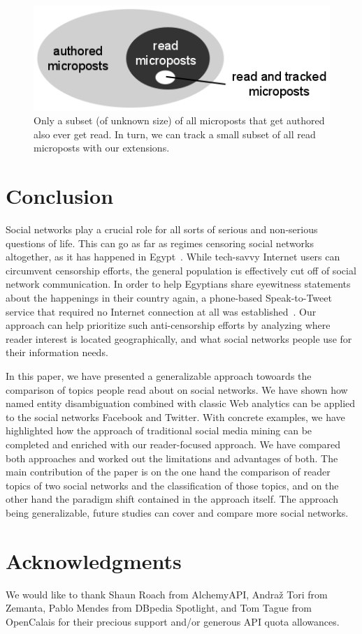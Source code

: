 \documentclass{iosart2c}
\begin{document}
\begin{figure}
\centering
\includegraphics[width=0.6\linewidth]{./resources/vennreadunread.png}
\caption{Only a subset (of unknown size) of all microposts that get authored also ever get read. In turn, we can track a small subset of all read microposts with our extensions.}
\label{fig:vennreadunread}
\end{figure}

\section{Conclusion} \label{sec:conclusion}
Social networks play a crucial role for all sorts of serious and non-serious questions of life.
This can go as far as regimes censoring social networks altogether, as it has happened in Egypt~\cite{censor}.
While tech-savvy Internet users can circumvent censorship efforts, the general population is effectively cut off of social network communication.
In order to help Egyptians share eyewitness statements about the happenings in their country again, a phone-based Speak-to-Tweet service that required no Internet connection at all was established~\cite{egypt}.
Our approach can help prioritize such anti-censorship efforts by analyzing where reader interest is located geographically, and what social networks people use for their information needs.

In this paper, we have presented a generalizable approach towoards the comparison of topics people read about on social networks.
We have shown how named entity disambiguation combined with classic Web analytics can be applied to the social networks Facebook and Twitter.
With concrete examples, we have highlighted how the approach of traditional social media mining can be completed and enriched with our reader-focused approach.
We have compared both approaches and worked out the limitations and advantages of both.
The main contribution of the paper is on the one hand the comparison of reader topics of two social networks and the classification of those topics, and on the other hand the paradigm shift contained in the approach itself.
The approach being generalizable, future studies can cover and compare more social networks.

\section*{Acknowledgments}
We would like to thank Shaun Roach from AlchemyAPI, Andraž Tori from Zemanta, Pablo Mendes from DBpedia Spotlight, and Tom Tague from OpenCalais for their precious support and/or generous API quota allowances. 



\end{document}
